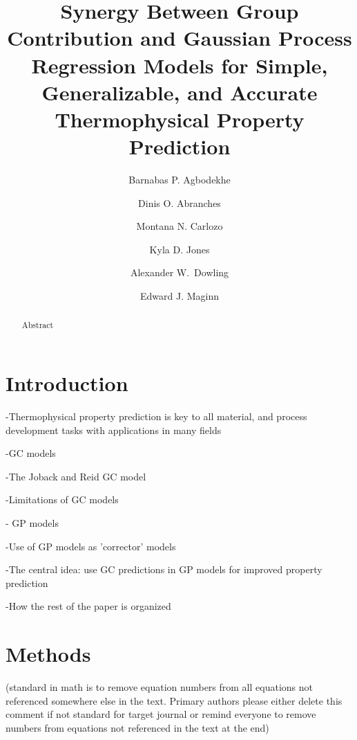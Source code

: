 \documentclass[journal=jacsat,manuscript=article]{achemso}
\author{Barnabas P. Agbodekhe}
\author{Dinis O. Abranches}
\author{Montana N. Carlozo}
\author{Kyla D. Jones}
\author{Alexander W.~Dowling}
\author{Edward J. Maginn}
\affiliation[University of Notre Dame]
{Department of Chemical and Biomolecular Engineering, University of Notre Dame, Notre Dame, IN 46556, USA}
\title[An \textsf{achemso}]
  {Synergy Between Group Contribution and Gaussian Process Regression Models for Simple, Generalizable, and Accurate Thermophysical Property Prediction}
\newcommand{\alltodo}[1]{{\color{cyan} (#1)}}
\begin{document}
\sloppy  %


\begin{abstract}
Abstract
\end{abstract}



\section{Introduction}


-Thermophysical property prediction is key to all material, and process development tasks with applications in many fields

-GC models

-The Joback and Reid GC model

-Limitations of GC models

- GP models

-Use of GP models as 'corrector' models

-The central idea: use GC predictions in GP models for improved property prediction

-How the rest of the paper is organized


\section{Methods}
\alltodo{standard in math is to remove equation numbers from all equations not referenced somewhere else in the text. Primary authors please either delete this comment if not standard for target journal or remind everyone to remove numbers from equations not referenced in the text at the end}
\end{document}
